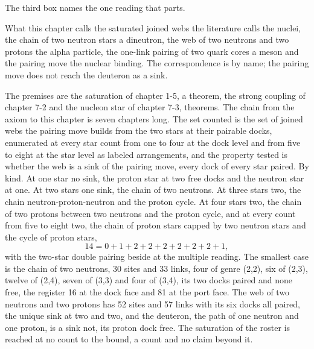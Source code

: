 The third box names the one reading that parts.
\begin{chbridge}
What this chapter calls the saturated joined webs the literature calls the nuclei, the chain of two neutron stars a dineutron, the web of two neutrons and two protons the alpha particle, the one-link pairing of two quark cores a meson and the pairing move the nuclear binding. The correspondence is by name; the pairing move does not reach the deuteron as a sink.
\end{chbridge}
\begin{chproof}[census]
The premises are the saturation of chapter 1-5, a theorem, the strong coupling of chapter 7-2 and the nucleon star of chapter 7-3, theorems. The chain from the axiom to this chapter is seven chapters long. The set counted is the set of joined webs the pairing move builds from the two stars at their pairable docks, enumerated at every star count from one to four at the dock level and from five to eight at the star level as labeled arrangements, and the property tested is whether the web is a sink of the pairing move, every dock of every star paired. By kind. At one star no sink, the proton star at two free docks and the neutron star at one. At two stars one sink, the chain of two neutrons. At three stars two, the chain neutron-proton-neutron and the proton cycle. At four stars two, the chain of two protons between two neutrons and the proton cycle, and at every count from five to eight two, the chain of proton stars capped by two neutron stars and the cycle of proton stars,
\begin{equation}
14 = 0 + 1 + 2 + 2 + 2 + 2 + 2 + 2 + 1 ,
\end{equation}
with the two-star double pairing beside at the multiple reading. The smallest case is the chain of two neutrons, 30 sites and 33 links, four of genre (2,2), six of (2,3), twelve of (2,4), seven of (3,3) and four of (3,4), its two docks paired and none free, the register 16 at the dock face and 81 at the port face. The web of two neutrons and two protons has 52 sites and 57 links with its six docks all paired, the unique sink at two and two, and the deuteron, the path of one neutron and one proton, is a sink not, its proton dock free. The saturation of the roster is reached at no count to the bound, a count and no claim beyond it.


\end{chproof}
